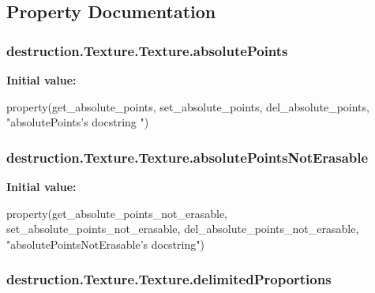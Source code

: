 \subsection{Property Documentation}
\hypertarget{classdestruction_1_1_texture_1_1_texture_a2a9be26626847923d0978eb84d2d58d8}{
\subsubsection[{absolute\-Points}]{\setlength{\rightskip}{0pt plus 5cm}destruction.\-Texture.\-Texture.\-absolute\-Points\hspace{0.3cm}{\ttfamily [static]}}}\label{classdestruction_1_1_texture_1_1_texture_a2a9be26626847923d0978eb84d2d58d8}
{\bfseries Initial value\-:}
\begin{DoxyCode}
property(get\_absolute\_points, set\_absolute\_points,
                               del\_absolute\_points, \textcolor{stringliteral}{"absolutePoints's docstring
      "})
\end{DoxyCode}
\hypertarget{classdestruction_1_1_texture_1_1_texture_a246ec1debed3d8e77e1db7072a416e22}{
\subsubsection[{absolute\-Points\-Not\-Erasable}]{\setlength{\rightskip}{0pt plus 5cm}destruction.\-Texture.\-Texture.\-absolute\-Points\-Not\-Erasable\hspace{0.3cm}{\ttfamily [static]}}}\label{classdestruction_1_1_texture_1_1_texture_a246ec1debed3d8e77e1db7072a416e22}
{\bfseries Initial value\-:}
\begin{DoxyCode}
property(get\_absolute\_points\_not\_erasable,
                                          set\_absolute\_points\_not\_erasable,
                                           del\_absolute\_points\_not\_erasable,
                                            \textcolor{stringliteral}{"absolutePointsNotErasable's
       docstring"})
\end{DoxyCode}
\hypertarget{classdestruction_1_1_texture_1_1_texture_a216a10063bec9f7e0ef98be8ffb51a9e}{
\subsubsection[{delimited\-Proportions}]{\setlength{\rightskip}{0pt plus 5cm}destruction.\-Texture.\-Texture.\-delimited\-Proportions\hspace{0.3cm}{\ttfamily [static]}}}\label{classdestruction_1_1_texture_1_1_texture_a216a10063bec9f7e0ef98be8ffb51a9e}
